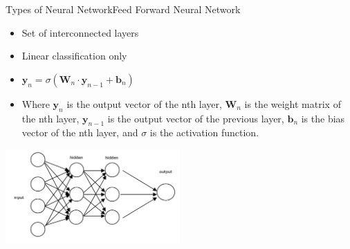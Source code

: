 \documentclass{beamer}
\begin{document}
\begin{frame}{Types of Neural Network}{Feed Forward Neural Network}
\begin{multicols}{2}
    \begin{itemize}
        \item Set of interconnected layers
        \item Linear classification only
        \item $\textbf{y}_n=\sigma{(\textbf{W}_n\cdot\textbf{y}_{n-1} + \textbf{b}_n)}$
        \item Where $\textbf{y}_n$ is the output vector of the nth layer, $\textbf{W}_n$ is the weight matrix of the nth layer, $\textbf{y}_{n-1}$ is the output vector of the previous layer, $\textbf{b}_n$ is the bias vector of the nth layer, and $\sigma$ is the activation function.
    \end{itemize}
    \begin{center}
        \includegraphics[width=0.5\textwidth]{images/feed forward}
    \end{center}
\end{multicols}
\end{frame}
\end{document}
